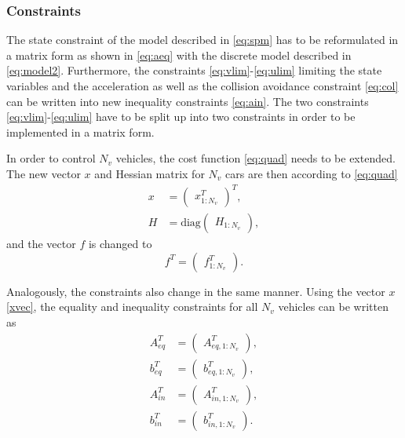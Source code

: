 \documentclass[letterpaper,10pt,conference]{ieeeconf}
\begin{document}
\subsubsection{Constraints}
The state constraint of the model described in \eqref{eq:spm} has to be reformulated in a matrix form as shown in \eqref{eq:aeq} with the discrete model described in \eqref{eq:model2}. Furthermore, the constraints \eqref{eq:vlim}-\eqref{eq:ulim} limiting the state variables and the acceleration as well as the collision avoidance constraint \eqref{eq:col} can be written into new inequality constraints \eqref{eq:ain}. The two constraints \eqref{eq:vlim}-\eqref{eq:ulim} have to be split up into two constraints in order to be implemented in a matrix form.

In order to control $N_v$ vehicles, the cost function \eqref{eq:quad} needs to be extended. The new vector $x$ and Hessian matrix for $N_v$ cars are then according to \eqref{eq:quad}
\begin{align}
x &=\begin{pmatrix}
x_{1:N_v}^T
\end{pmatrix}^T,\label{xvec}\\
H &= \text{diag}\begin{pmatrix}H_{1:N_v}\end{pmatrix},
\end{align}
and the vector $f$ is changed to
\begin{equation}
f^T =
\begin{pmatrix}
f^T_{1:N_v}
\end{pmatrix}.
\end{equation}

Analogously, the constraints also change in the same manner. Using the vector $x$ \eqref{xvec}, the equality and inequality constraints for all $N_v$ vehicles can be written as
\begin{align}
A_{eq}^T&=
\begin{pmatrix}
    A_{eq,1:N_v}^T
    \end{pmatrix},\\
    b_{eq}^T&=\begin{pmatrix}
    b_{eq,1:N_v}^T
    \end{pmatrix}, \\
A_{in}^T&=
\begin{pmatrix}
    A_{in,1:N_v}^T
    \end{pmatrix},\\
    b_{in}^T&=\begin{pmatrix}
    b_{in,1:N_v}^T
    \end{pmatrix}.
\end{align}
\end{document}
